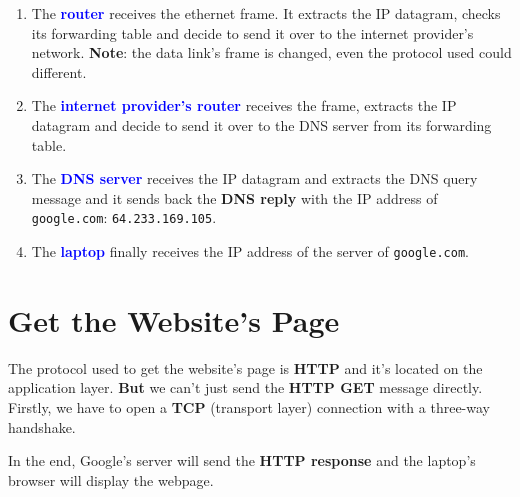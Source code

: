 \documentclass[a4paper]{article}
\begin{document}
\begin{enumerate}





\item The \textcolor{blue}{\textbf{router}} receives the ethernet frame. It extracts the IP datagram, checks its forwarding table and decide to send it over to the internet provider's network. \textbf{Note}: the data link's frame is changed, even the protocol used could different.





\item The \textcolor{blue}{\textbf{internet provider's router}} receives the frame, extracts the IP datagram and decide to send it over to the DNS server from its forwarding table.





\item The \textcolor{blue}{\textbf{DNS server}} receives the IP datagram and extracts the DNS query message and it sends back the \textbf{DNS reply} with the IP address of \texttt{google.com}: \texttt{64.233.169.105}.





\item The \textcolor{blue}{\textbf{laptop}} finally receives the IP address of the server of \texttt{google.com}.





\end{enumerate}















\section{Get the Website's Page}





The protocol used to get the website's page is \textbf{HTTP} and it's located on the application layer. \textbf{But} we can't just send the \textbf{HTTP GET} message directly. Firstly, we have to open a \textbf{TCP} (transport layer) connection with a three-way handshake.

In the end, Google's server will send the \textbf{HTTP response} and the laptop's browser will display the webpage.
\end{document}
